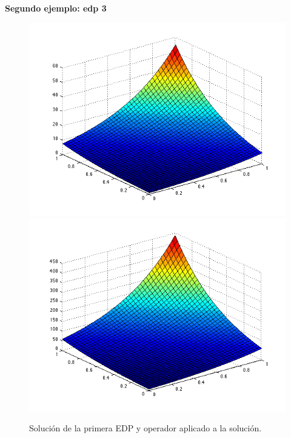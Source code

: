 \documentclass[11pt,a4paper]{article}
\begin{document}
 \newpage
\textbf{Segundo ejemplo: edp 3}
\begin{figure}[H]
\includegraphics[scale=.45]{edp3.png}
\includegraphics[scale=.45]{Ledp3.png}
\caption{Solución de la primera EDP y operador aplicado a la solución.}
\end{figure}
\end{document}
